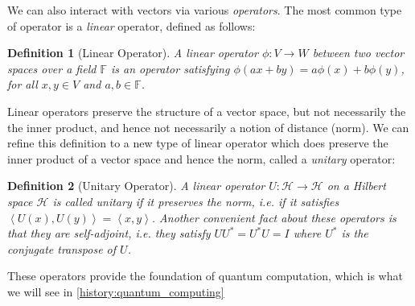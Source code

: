 \documentclass{article}
\theoremstyle{plain}
\theoremstyle{centered}
\newtheorem{definition}{Definition}
\newcommand{\camelia}{{\color{red}comment: }}
\newcommand{\inner}[2]{\left\langle #1, #2 \right\rangle}
\newcommand{\bb}[1]{\mathbb{#1}}
\renewcommand{\cal}[1]{\mathcal{#1}}
\begin{document}
        
        We can also interact with vectors via various \textit{operators}.
        The most common type of operator is a \textit{linear} operator, defined as follows:


        
        \begin{definition}[Linear Operator]\label{def:linear_operator}
            A \textit{linear operator} $\phi : V \to W$ between two vector spaces over a field $\bb{F}$ is an operator satisfying $\phi(ax + by) = a\phi(x) + b\phi(y)$, for all $x, y \in V$ and $a, b \in \bb{F}$.
        \end{definition}
        Linear operators preserve the structure of a vector space, but not necessarily the the inner product, and hence not necessarily a notion of distance (norm).
        We can refine this definition to a new type of linear operator which does preserve the inner product of a vector space and hence the norm, called a \textit{unitary} operator:
        \begin{definition}[Unitary Operator]\label{def:unitary_operator}
            A linear operator $U : \cal{H} \to \cal{H}$ on a Hilbert space $\cal{H}$ is called \textit{unitary} if it preserves the norm, i.e. if it satisfies $\inner{U(x)}{U(y)} = \inner{x}{y}$.
            Another convenient fact about these operators is that they are \textit{self-adjoint}, i.e. they satisfy $UU^* = U^*U = I$ where $U^*$ is the conjugate transpose of $U$.
        \end{definition}


        These operators provide the foundation of quantum computation, which is what we will see in \cref{history:quantum_computing}
        
\end{document}
